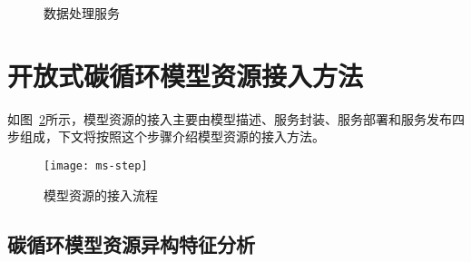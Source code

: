 \begin{figure}[!htbp]
    \centering
    \hfill
    \hfill
    \caption{数据处理服务}
    \label{fig:data-process-service}
\end{figure}





\section{开放式碳循环模型资源接入方法}
\label{sec:model-joinup}
如图~\ref{fig:ms-step}所示，模型资源的接入主要由模型描述、服务封装、服务部署和服务发布四步组成，下文将按照这个步骤介绍模型资源的接入方法。

\begin{figure}[!htbp]
    \centering
    \texttt{[image: ms-step]}
    \caption{模型资源的接入流程}
    \label{fig:ms-step}
\end{figure}

\subsection{碳循环模型资源异构特征分析}

